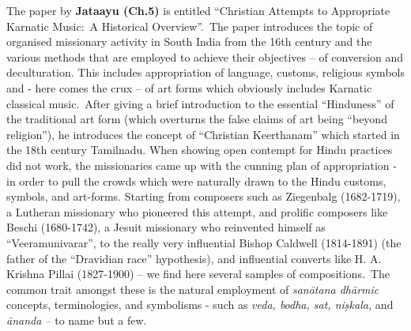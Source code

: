 The paper by \textbf{Jataayu (Ch.5)} is entitled “Christian Attempts to Appropriate Karnatic Music:~A Historical Overview”.~The paper introduces the topic of organised missionary activity in South India from the 16th century and the various methods that are employed to achieve their objectives – of conversion and deculturation. This includes appropriation of language, customs, religious symbols and - here comes the crux – of art forms which obviously includes Karnatic classical music.~After giving a brief introduction to the essential “Hinduness” of the traditional art form (which overturns the false claims of art being “beyond religion”), he introduces the concept of “Christian Keerthanam” which started in the 18th century Tamilnadu. When showing open contempt for Hindu practices did not work, the missionaries came up with the cunning plan of appropriation - in order to pull the crowds which were naturally drawn to the Hindu customs, symbols, and art-forms. Starting from composers such as Ziegenbalg (1682-1719), a Lutheran missionary who pioneered this attempt, and prolific composers like Beschi (1680-1742), a Jesuit missionary who reinvented himself as “Veeramunivarar”, to the really very influential Bishop Caldwell (1814-1891) (the father of the “Dravidian race” hypothesis), and influential converts like H. A. Krishna Pillai (1827-1900) – we find here several samples of compositions.~The common trait amongst these is the natural employment of \textit{sanātana dhārmic} concepts, terminologies, and symbolisms - such as \textit{veda, bodha, sat, niṣkala,} and \textit{ānanda –} to name but a few.

